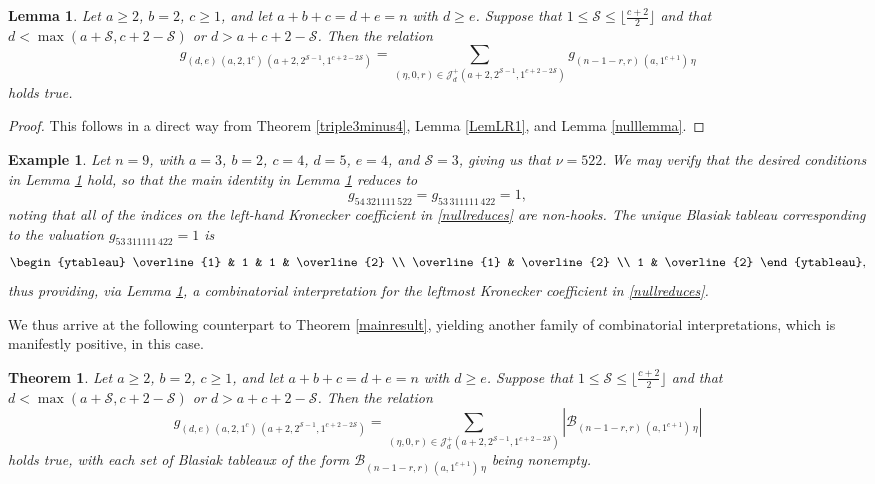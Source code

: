 \documentclass[12pt]{article}
\newtheorem{theorem}{Theorem}
\newtheorem{lemma}{Lemma}%
\newtheorem{example}{Example}
\begin{document}
\begin{lemma}\label{nullsecondlemma}
 Let $a \geq 2$, $b=2$, $c\geq 1$, and let $a+b+c=d+e=n$ with $d\geq e$.
 Suppose that $1\leq \mathcal{S}  \leq \lfloor \frac{c+2}{2} \rfloor$
 and that $ d < \max(a+\mathcal{S}, c + 2 - \mathcal{S})$ or 
$d>a+c+2-\mathcal S$. 
 Then the relation 
 $$ g_{(d, e) \, (a, 2, 1^c) \, (a + 
 2, 2^{\mathcal{S} - 
 1},1^{c+2-2\mathcal{S}})} = 
 \sum_{ (\eta, 0, 
 r) \in \mathcal{J}^{+}_{d}(a + 
 2,2^{\mathcal{S} -   1},1^{c+2-2\mathcal{S}}) } 
 g_{(n - 1 - r, r) \, (a, 1^{c+1}) \, \eta }   $$ holds true. 
\end{lemma}

\begin{proof}
 This follows in a direct way from Theorem \ref{triple3minus4}, Lemma \ref{LemLR1},   and Lemma \ref{nulllemma}. 
\end{proof}

\begin{example}
 Let $n = 9$, with $a = 3$, $b = 2$, $c = 4$, $d = 5$, $e = 4$, and $\mathcal{S} = 3$, giving us that $\nu = 522$. We may verify that the 
 desired conditions in Lemma \ref{nullsecondlemma} hold, so that the main identity in Lemma \ref{nullsecondlemma} reduces to 
\begin{equation}\label{nullreduces}
 g_{54 \, 321111 \, 522} = g_{53 \, 311111 \, 422} = 1, 
\end{equation}
 noting that all of the indices on the left-hand Kronecker coefficient in \eqref{nullreduces} are non-hooks. The unique Blasiak tableau 
 corresponding to the valuation $g_{53 \, 311111 \, 422} = 1$ is $$ \begin{ytableau} \overline{1} & 1 & 1 & \overline{2} \\ 
 \overline{1} & \overline{2} \\ 1 & \overline{2} \end{ytableau}, $$ thus providing, via Lemma \ref{nullsecondlemma}, 
 a combinatorial interpretation for the leftmost Kronecker coefficient in \eqref{nullreduces}. 
\end{example}

 We thus arrive at the following counterpart to Theorem \ref{mainresult}, yielding another family of combinatorial interpretations, 
 which is manifestly positive, in this case. 

\begin{theorem}\label{mainresult2}
 Let $a \geq 2$, $b=2$, $c\geq 1$, and let $a+b+c=d+e=n$ with $d\geq e$. Suppose that $1\leq \mathcal S\leq \lfloor \frac{c + 
 2}{2} \rfloor$ and that $ d < \max(a+\mathcal S,c+2-\mathcal S)$ or $d > a + c + 2 - \mathcal{S}$. Then the relation $$ g_{(d, e) \, 
 (a, 2, 1^c) \, (a + 2, 2^{\mathcal{S} - 1}, 1^{c+2 - 2 \mathcal{S}})} = 
 \sum_{ (\eta, 0, r) \in \mathcal{J}^{+}_{d}(a+2,2^{\mathcal S-1},1^{c+2-2\mathcal S}) } 
 \left| \mathcal{B}_{(n - 1 - r, r) \, (a, 1^{c+1}) \, \eta } \right| 
 $$ holds true, 
 with each set of Blasiak tableaux of the form 
 $ \mathcal{B}_{(n - 1 - r, r) \, (a, 1^{c+1}) \, \eta } $ being nonempty. 
\end{theorem}
\end{document}
